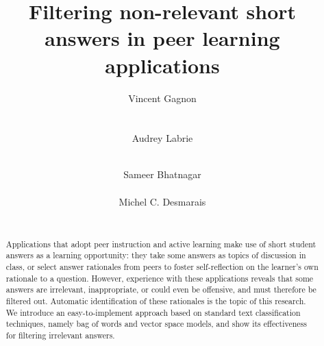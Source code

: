 \documentclass{edm_template}
\begin{document}

\isbn{}


\newcommand{\Mem}[1]{\hl{[#1]}}
\newcommand{\Mmathsym}[1]{\mathrm{#1}}

\title{Filtering non-relevant short answers in peer learning applications}


\newcommand{\ignore}[1]{}
\author{
\alignauthor
Vincent Gagnon\\
    \\~\\
\alignauthor
Audrey Labrie\\
    \\
\and
\alignauthor
Sameer Bhatnagar\\
    \\
\alignauthor
Michel C. Desmarais\\
    \\
}
\ignore{
\alignauthor
1st. author\\
    \affaddr{Institution}\\~\\
\alignauthor
2nd. author\\
    \affaddr{Institution}\\
\and
\alignauthor
3rd. author\\
    \affaddr{Institution}\\
\alignauthor
4th. author\\
    \affaddr{Institution}\\
}

\maketitle


\begin{abstract}
Applications that adopt peer instruction and active learning make use of short student answers as a learning opportunity: they take some answers as topics of discussion in class, or select answer rationales from peers to foster self-reflection on the learner's own rationale to a question.  However, experience with these applications reveals that some answers are irrelevant, inappropriate, or could even be offensive, and must therefore be filtered out.  Automatic identification of these rationales is the topic of this research.  We introduce an easy-to-implement approach based on standard text classification techniques, namely bag of words and vector space models, and show its effectiveness for filtering irrelevant answers.
\end{abstract}
\end{document}
